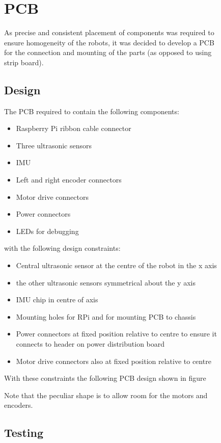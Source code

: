 \begin{figure}[!ht]
\section{PCB}\label{elec/pcb}
As precise and consistent placement of components was required to ensure homogeneity of the robots, it was decided to develop a PCB for the connection and mounting of the parts (as opposed to using strip board).  
\subsection{Design}\label{elec/pcb/design}
The PCB required to contain the following components:
\begin{itemize}
  \item Raspberry Pi ribbon cable connector
  \item Three ultrasonic sensors
  \item IMU
  \item Left and right encoder connectors
  \item Motor drive connectors
  \item Power connectors
  \item LEDs for debugging
\end{itemize}

with the following design constraints:

\begin{itemize}
  \item Central ultrasonic sensor at the centre of the robot in the x axis
  \item the other ultrasonic sensors symmetrical about the y axis
  \item IMU chip in centre of axis
  \item Mounting holes for RPi and for mounting PCB to chassis
  \item Power connectors at fixed position relative to centre to ensure it connects to header on power distribution board
  \item Motor drive connectors also at fixed position relative to centre 
\end{itemize}
With these constraints the following PCB design shown in figure 

Note that the peculiar shape is to allow room for the motors and encoders. 

\subsection{Testing}\label{elec/pcb/test}


\end{figure}
